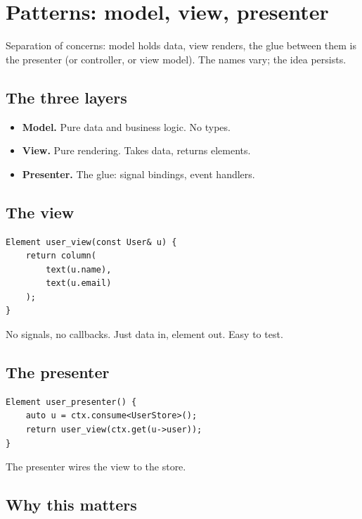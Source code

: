 \chapter{Patterns: model, view, presenter}
\label{ch:mvp}

\begin{aside}
Separation of concerns: model holds data, view renders, the
glue between them is the presenter (or controller, or view
model). The names vary; the idea persists.
\end{aside}

\section{The three layers}

\begin{itemize}[leftmargin=*]
  \item \textbf{Model.} Pure data and business logic. No
    \maya{} types.
  \item \textbf{View.} Pure rendering. Takes data, returns
    elements.
  \item \textbf{Presenter.} The glue: signal bindings,
    event handlers.
\end{itemize}

\section{The view}

\begin{lstlisting}
Element user_view(const User& u) {
    return column(
        text(u.name),
        text(u.email)
    );
}
\end{lstlisting}

No signals, no callbacks. Just data in, element out. Easy
to test.

\section{The presenter}

\begin{lstlisting}
Element user_presenter() {
    auto u = ctx.consume<UserStore>();
    return user_view(ctx.get(u->user));
}
\end{lstlisting}

The presenter wires the view to the store.

\section{Why this matters}

